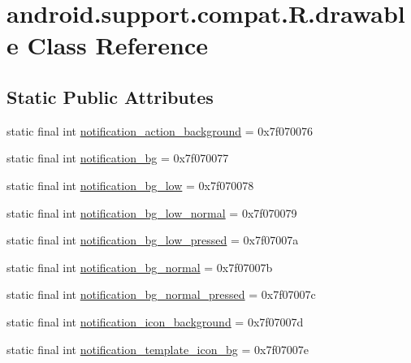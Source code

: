 \hypertarget{classandroid_1_1support_1_1compat_1_1_r_1_1drawable}{}\section{android.\+support.\+compat.\+R.\+drawable Class Reference}
\label{classandroid_1_1support_1_1compat_1_1_r_1_1drawable}
\subsection*{Static Public Attributes}
\begin{DoxyCompactItemize}
\item 
static final int \mbox{\hyperlink{classandroid_1_1support_1_1compat_1_1_r_1_1drawable_a5a0ff2bac77963f6f055c8a58fa8cddc}{notification\+\_\+action\+\_\+background}} = 0x7f070076
\item 
static final int \mbox{\hyperlink{classandroid_1_1support_1_1compat_1_1_r_1_1drawable_ac1c881403cf01387a0e98a7570b876b5}{notification\+\_\+bg}} = 0x7f070077
\item 
static final int \mbox{\hyperlink{classandroid_1_1support_1_1compat_1_1_r_1_1drawable_a50d65295159113b04a778cb5ba4e2867}{notification\+\_\+bg\+\_\+low}} = 0x7f070078
\item 
static final int \mbox{\hyperlink{classandroid_1_1support_1_1compat_1_1_r_1_1drawable_a36abe44ab726cfdcec08ea89273622cd}{notification\+\_\+bg\+\_\+low\+\_\+normal}} = 0x7f070079
\item 
static final int \mbox{\hyperlink{classandroid_1_1support_1_1compat_1_1_r_1_1drawable_a7a21ec6e1a66256a6e5fb1c7086d77f0}{notification\+\_\+bg\+\_\+low\+\_\+pressed}} = 0x7f07007a
\item 
static final int \mbox{\hyperlink{classandroid_1_1support_1_1compat_1_1_r_1_1drawable_acc54d2d50a9408e4498025dfd0f797a2}{notification\+\_\+bg\+\_\+normal}} = 0x7f07007b
\item 
static final int \mbox{\hyperlink{classandroid_1_1support_1_1compat_1_1_r_1_1drawable_adb300808ead93d2b6dfaaddcc86b1c10}{notification\+\_\+bg\+\_\+normal\+\_\+pressed}} = 0x7f07007c
\item 
static final int \mbox{\hyperlink{classandroid_1_1support_1_1compat_1_1_r_1_1drawable_a24197e0b532bda0461aa61918e2e1aee}{notification\+\_\+icon\+\_\+background}} = 0x7f07007d
\item 
static final int \mbox{\hyperlink{classandroid_1_1support_1_1compat_1_1_r_1_1drawable_a031cc831b36dacf4d9503beaf4ee1190}{notification\+\_\+template\+\_\+icon\+\_\+bg}} = 0x7f07007e

\end{DoxyCompactItemize}
